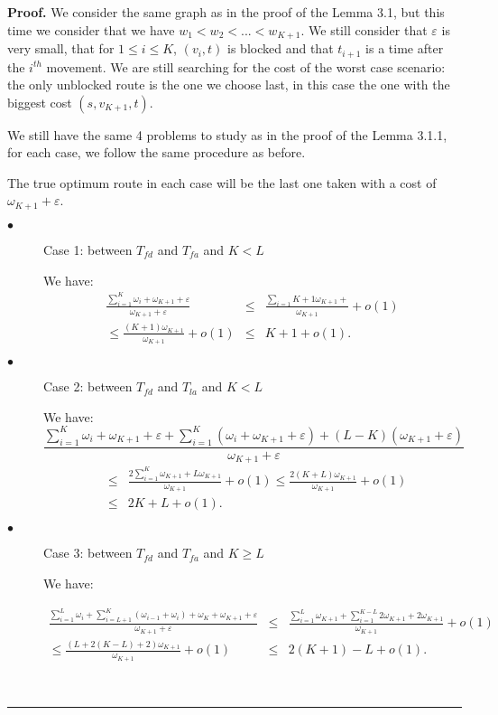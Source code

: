\documentclass[letter-size, 11pt]{article}
\newenvironment{proof}[1][Proof]{\textbf{#1.} }{\ \rule{0.5em}{0.5em}}
\begin{document}
\begin{proof} We consider the same graph as in the proof of the Lemma 3.1, but this time we consider that we have $w_1 < w_2 < ... < w_{K+1}$. We still consider that $\varepsilon$ is very small, that for $1\leq i \leq K$, $(v_i,t)$ is blocked and that $t_{i+1}$ is a time after the $i^{th}$ movement. We are still searching for the cost of the worst case scenario: the only unblocked route is the one we choose last, in this case the one with the biggest cost $(s,v_{K+1},t)$.


We still have the same 4 problems to study as in the proof of the Lemma 3.1.1, for each case, we follow the same procedure as before.

The true optimum route in each case will be the last one taken with a cost of $\omega_{K+1} + \varepsilon$.

\begin{description}
\item[$\bullet$] Case 1: between $T_{fd}$ and $T_{fa}$ and $K<L$

We have: 
\begin{eqnarray}
\frac {\sum_{i=1}^{K} \omega_{i} + \omega_{K+1} + \varepsilon} {\omega_{K+1} + \varepsilon} &\leq& \frac {\sum_{i=1}{K+1} \omega_{K+1} +} {\omega_{K+1}} + o(1)  \nonumber \\
\leq \frac {(K+1)\omega_{K+1} } {\omega_{K+1}} + o(1) &\leq& K+1 + o(1).\nonumber
\end{eqnarray}

\item[$\bullet$] Case 2: between $T_{fd}$ and $T_{la}$ and $K<L$

We have:
\[
\frac {\sum_{i=1}^{K} \omega_{i} +  \omega_{K+1} + \varepsilon + \sum_{i=1}^{K}(\omega_{i} + \omega_{K+1} + \varepsilon) + (L - K) ( \omega_{K+1} + \varepsilon )}{\omega_{K+1} + \varepsilon}
\]
\begin{eqnarray}
&\leq& \frac {2\sum_{i=1}^{K} \omega_{K+1} + L\omega_{K+1}}{\omega_{K+1}} + o(1) \leq \frac {2(K+L)\omega_{K+1}}{\omega_{K+1}} + o(1) \nonumber\\
 &\leq& 2K+ L + o(1).\nonumber
\end{eqnarray}

\item[$\bullet$] Case 3: between $T_{fd}$ and $T_{fa}$ and $K \geq L$

We have: 

\begin{eqnarray}
\frac {\sum_{i=1}^{L} \omega_{i} + \sum_{i=L+1}^{K}(\omega_{i-1} + \omega_{i} ) + \omega_{K} + \omega_{K+1} + \varepsilon} {\omega_{K+1} + \varepsilon} 
&\leq& \frac {\sum_{i=1}^{L} \omega_{K+1} + \sum_{i=1}^{K-L}2\omega_{K+1} + 2\omega_{K+1}}{\omega_{K+1}} + o(1) \nonumber\\
\leq \frac {(L + 2(K - L) + 2)\omega_{K+1}}{\omega_{K+1}} + o(1)
&\leq& 2(K + 1 ) - L + o(1).\nonumber
\end{eqnarray}


\end{description}
\end{proof}
\end{document}
